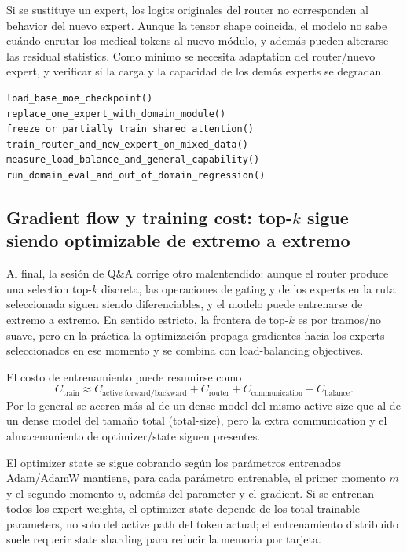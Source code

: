 Si se sustituye un expert, los logits originales del router no corresponden al behavior del nuevo expert. Aunque la tensor shape coincida, el modelo no sabe cuándo enrutar los medical tokens al nuevo módulo, y además pueden alterarse las residual statistics. Como mínimo se necesita adaptation del router/nuevo expert, y verificar si la carga y la capacidad de los demás experts se degradan.

\begin{lstlisting}[caption={Flujo mínimo de validación tras sustituir un expert}]
load_base_moe_checkpoint()
replace_one_expert_with_domain_module()
freeze_or_partially_train_shared_attention()
train_router_and_new_expert_on_mixed_data()
measure_load_balance_and_general_capability()
run_domain_eval_and_out_of_domain_regression()
\end{lstlisting}


\subsection{Gradient flow y training cost: \texorpdfstring{top-$k$}{top-k} sigue siendo optimizable de extremo a extremo}

Al final, la sesión de Q\&A corrige otro malentendido: aunque el router produce una selection top-$k$ discreta, las operaciones de gating y de los experts en la ruta seleccionada siguen siendo diferenciables, y el modelo puede entrenarse de extremo a extremo. En sentido estricto, la frontera de top-$k$ es por tramos/no suave, pero en la práctica la optimización propaga gradientes hacia los experts seleccionados en ese momento y se combina con load-balancing objectives.

El costo de entrenamiento puede resumirse como
\[
C_{\text{train}}\approx C_{\text{active forward/backward}}+C_{\text{router}}+C_{\text{communication}}+C_{\text{balance}}.
\]
Por lo general se acerca más al de un dense model del mismo active-size que al de un dense model del tamaño total (total-size), pero la extra communication y el almacenamiento de optimizer/state siguen presentes.

\begin{knowledgebox}{El optimizer state se sigue cobrando según los parámetros entrenados}
Adam/AdamW mantiene, para cada parámetro entrenable, el primer momento $m$ y el segundo momento $v$, además del parameter y el gradient. Si se entrenan todos los expert weights, el optimizer state depende de los total trainable parameters, no solo del active path del token actual; el entrenamiento distribuido suele requerir state sharding para reducir la memoria por tarjeta.
\end{knowledgebox}


